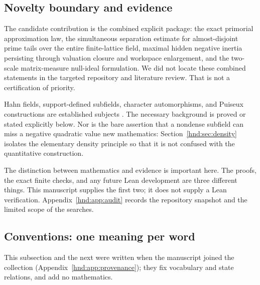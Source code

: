 \documentclass[11pt,oneside]{article}
\theoremstyle{definition}
\theoremstyle{remark}
\begin{document}
\subsection{Novelty boundary and evidence}

The candidate contribution is the combined explicit package: the exact
primorial approximation law, the simultaneous separation estimate for
almost-disjoint prime tails over the entire finite-lattice field, maximal
hidden negative inertia persisting through valuation closure and workspace
enlargement, and the two-scale matrix-measure null-ideal formulation.
We did not locate these combined statements in the targeted repository
and literature review. That is not a certification of priority.

Hahn fields, support-defined subfields, character automorphisms, and
Puiseux constructions are established subjects
\cite{rayner,rayner-structures,automorphisms}. The necessary background is
proved or stated explicitly below. Nor is the bare assertion that a
nondense subfield can miss a negative quadratic value new mathematics:
Section~\ref{hnd:sec:density} isolates the elementary density principle so
that it is not confused with the quantitative construction.

The distinction between mathematics and evidence is important here.
The proofs, the exact finite checks, and any future Lean development are
three different things. This manuscript supplies the first two; it does
not supply a Lean verification. Appendix~\ref{hnd:app:audit} records the
repository snapshot and the limited scope of the searches.

\subsection{Conventions: one meaning per word}\label{hnd:sec:conventions}

This subsection and the next were written when the manuscript joined the
collection (Appendix~\ref{hnd:app:provenance}); they fix vocabulary and
state relations, and add no mathematics.
\end{document}
